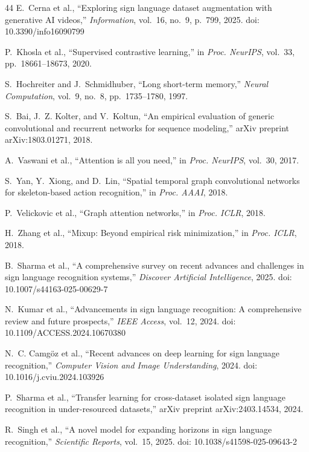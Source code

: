 \documentclass[conference]{IEEEtran}
\begin{document}
\begin{thebibliography}{44}
E.~Cerna et al., ``Exploring sign language dataset augmentation with generative
AI videos,'' \textit{Information}, vol.~16, no.~9, p.~799, 2025.
doi: 10.3390/info16090799

P.~Khosla et al., ``Supervised contrastive learning,'' in \textit{Proc.
NeurIPS}, vol.~33, pp.~18661--18673, 2020.

S.~Hochreiter and J.~Schmidhuber, ``Long short-term memory,'' \textit{Neural
Computation}, vol.~9, no.~8, pp.~1735--1780, 1997.

S.~Bai, J.~Z. Kolter, and V.~Koltun, ``An empirical evaluation of generic
convolutional and recurrent networks for sequence modeling,'' arXiv preprint
arXiv:1803.01271, 2018.

A.~Vaswani et al., ``Attention is all you need,'' in \textit{Proc. NeurIPS},
vol.~30, 2017.

S.~Yan, Y.~Xiong, and D.~Lin, ``Spatial temporal graph convolutional networks
for skeleton-based action recognition,'' in \textit{Proc. AAAI}, 2018.

P.~Velickovic et al., ``Graph attention networks,'' in \textit{Proc. ICLR},
2018.

H.~Zhang et al., ``Mixup: Beyond empirical risk minimization,'' in
\textit{Proc. ICLR}, 2018.

B.~Sharma et al., ``A comprehensive survey on recent advances and challenges in
sign language recognition systems,'' \textit{Discover Artificial Intelligence},
2025. doi: 10.1007/s44163-025-00629-7

N.~Kumar et al., ``Advancements in sign language recognition: A comprehensive
review and future prospects,'' \textit{IEEE Access}, vol.~12, 2024.
doi: 10.1109/ACCESS.2024.10670380

N.~C. Camgöz et al., ``Recent advances on deep learning for sign language
recognition,'' \textit{Computer Vision and Image Understanding}, 2024.
doi: 10.1016/j.cviu.2024.103926

P.~Sharma et al., ``Transfer learning for cross-dataset isolated sign language
recognition in under-resourced datasets,'' arXiv preprint arXiv:2403.14534,
2024.

R.~Singh et al., ``A novel model for expanding horizons in sign language
recognition,'' \textit{Scientific Reports}, vol.~15, 2025.
doi: 10.1038/s41598-025-09643-2

\end{thebibliography}
\end{document}
